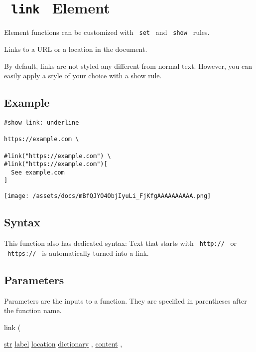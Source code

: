 \section{\texorpdfstring{\texttt{\ link\ } {{ Element
}}}{ link   Element }}\label{summary}

\label{element-tooltip}
Element functions can be customized with \texttt{\ set\ } and
\texttt{\ show\ } rules.

Links to a URL or a location in the document.

By default, links are not styled any different from normal text.
However, you can easily apply a style of your choice with a show rule.

\subsection{Example}\label{example}

\begin{verbatim}
#show link: underline

https://example.com \

#link("https://example.com") \
#link("https://example.com")[
  See example.com
]
\end{verbatim}

\texttt{[image: /assets/docs/mBfQJYO4ObjIyuLi\_FjKfgAAAAAAAAAA.png]}

\subsection{Syntax}\label{syntax}

This function also has dedicated syntax: Text that starts with
\texttt{\ http://\ } or \texttt{\ https://\ } is automatically turned
into a link.

\subsection{\texorpdfstring{{ Parameters
}}{ Parameters }}\label{parameters}

\label{parameters-tooltip}
Parameters are the inputs to a function. They are specified in
parentheses after the function name.

{ link } (

{ \href{/docs/reference/foundations/str/}{str}
\href{/docs/reference/foundations/label/}{label}
\href{/docs/reference/introspection/location/}{location}
\href{/docs/reference/foundations/dictionary/}{dictionary} , } {
\href{/docs/reference/foundations/content/}{content} , }

